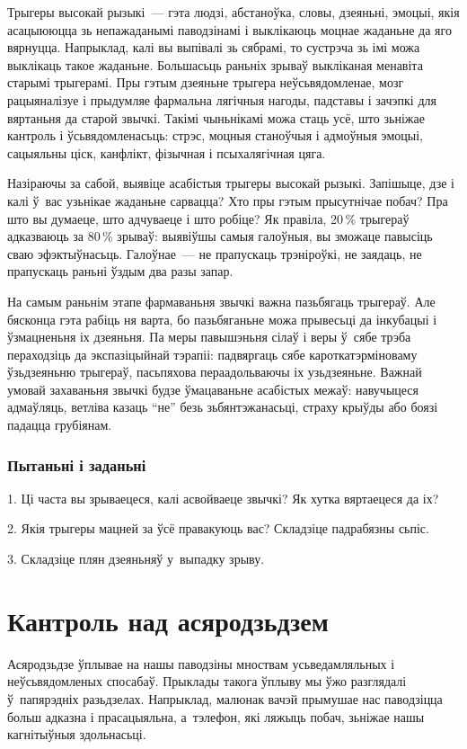 Трыгеры высокай рызыкі~--- гэта людзі, абстаноўка, словы, дзеяньні, эмоцыі, якія асацыююцца зь непажаданымі паводзінамі і выклікаюць моцнае жаданьне да яго вярнуцца. Напрыклад, калі вы выпівалі зь сябрамі, то сустрэча зь імі можа выклікаць такое жаданьне. Большасьць раньніх зрываў выкліканая менавіта старымі трыгерамі. Пры гэтым дзеяньне трыгера неўсьвядомленае, мозг рацыяналізуе і прыдумляе фармальна лягічныя нагоды, падставы і зачэпкі для вяртаньня да старой звычкі. Такімі чыньнікамі можа стаць усё, што зьніжае кантроль і ўсьвядомленасьць: стрэс, моцныя станоўчыя і адмоўныя эмоцыі, сацыяльны ціск, канфлікт, фізычная і псыхалягічная цяга.

Назіраючы за сабой, выявіце асабістыя трыгеры высокай рызыкі. Запішыце, дзе і калі ў~вас узьнікае жаданьне сарвацца? Хто пры гэтым прысутнічае побач? Пра што вы думаеце, што адчуваеце і што робіце? Як правіла, 20\,\% трыгераў адказваюць за 80\,\% зрываў: выявіўшы самыя галоўныя, вы зможаце павысіць сваю эфэктыўнасьць. Галоўнае~--- не прапускаць трэніроўкі, не заядаць, не прапускаць раньні ўздым два разы запар.

На самым раньнім этапе фармаваньня звычкі важна пазьбягаць трыгераў. Але бясконца гэта рабіць ня варта, бо пазьбяганьне можа прывесьці да інкубацыі і ўзмацненьня іх дзеяньня. Па меры павышэньня сілаў і веры ў~сябе трэба пераходзіць да экспазіцыйнай тэрапіі: падвяргаць сябе кароткатэрміноваму ўзьдзеяньню трыгераў, пасьпяхова пераадольваючы іх узьдзеяньне. Важнай умовай захаваньня звычкі будзе ўмацаваньне асабістых межаў: навучыцеся адмаўляць, ветліва казаць ``не'' безь зьбянтэжанасьці, страху крыўды або боязі падацца грубіянам.

\subsubsection{Пытаньні і заданьні}

1. Ці часта вы зрываецеся, калі асвойваеце звычкі? Як хутка вяртаецеся да іх?

2. Якія трыгеры мацней за ўсё правакуюць вас? Складзіце падрабязны сьпіс.

3. Складзіце плян дзеяньняў у~выпадку зрыву.


\section{Кантроль над асяродзьдзем}

Асяродзьдзе ўплывае на нашы паводзіны мноствам усьведамляльных і неўсьвядомленых спосабаў. Прыклады такога ўплыву мы ўжо разглядалі ў~папярэдніх разьдзелах. Напрыклад, малюнак вачэй прымушае нас паводзіцца больш адказна і прасацыяльна, а~тэлефон, які ляжыць побач, зьніжае нашы кагнітыўныя здольнасьці. 

